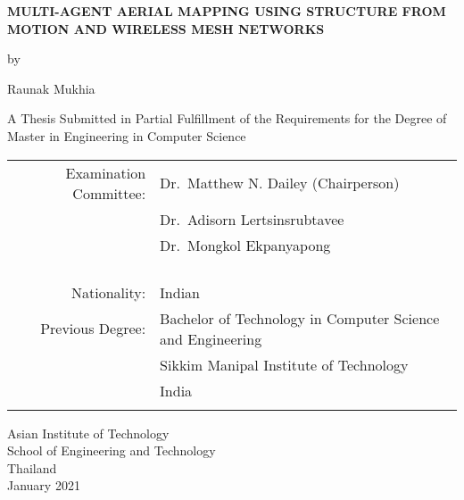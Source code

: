 \begin{titlepage}
  \begin{center}
   
  \textbf{\large{
  MULTI-AGENT AERIAL MAPPING USING STRUCTURE FROM MOTION AND WIRELESS MESH NETWORKS
  }}

  \vspace{3em} %
  
  by
  
  \vspace{3em} %
  
  Raunak Mukhia
  
  \vspace{4em} %

  A Thesis Submitted in Partial Fulfillment of the Requirements for the Degree of Master in Engineering in Computer Science

  \vspace{4em} %

\begin{center}
  \begin{tabular}{ rl }
Examination Committee: & Dr.\ Matthew N. Dailey (Chairperson) \\
                       & Dr.\ Adisorn Lertsinsrubtavee \\ 
                       & Dr.\ Mongkol Ekpanyapong \\\\
                       
\\ \\ \\
Nationality:     & Indian \\
Previous Degree: & Bachelor of Technology in Computer Science and Engineering \\
                 & Sikkim Manipal Institute of Technology \\
                 & India \\
\\
  \end{tabular}
\end{center}

\vspace{4em}

Asian Institute of Technology \\
School of Engineering and Technology \\
Thailand \\ 
January 2021


  \end{center}
\end{titlepage}
